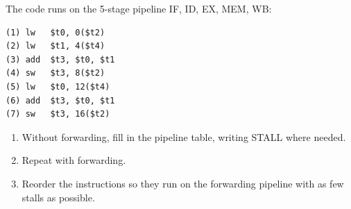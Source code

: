 \begin{exercise}\label{l:pipe-code}
The code runs on the 5-stage pipeline IF, ID, EX, MEM, WB:
\begin{lstlisting}
(1) lw   $t0, 0($t2)
(2) lw   $t1, 4($t4)
(3) add  $t3, $t0, $t1
(4) sw   $t3, 8($t2)
(5) lw   $t0, 12($t4)
(6) add  $t3, $t0, $t1
(7) sw   $t3, 16($t2)
\end{lstlisting}
\begin{enumerate}[label=(\alph*),leftmargin=*]
  \item Without forwarding, fill in the pipeline table, writing STALL where needed.
  \item Repeat with forwarding.
  \item Reorder the instructions so they run on the forwarding pipeline with as few
  stalls as possible.
\end{enumerate}
\end{exercise}
